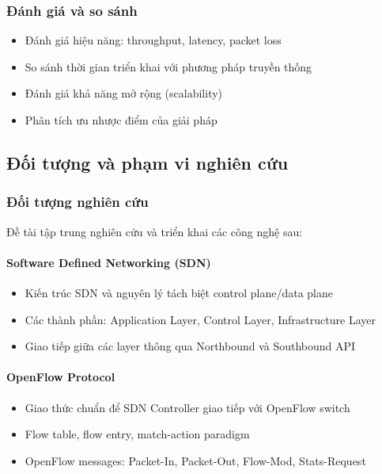 \subsubsection{Đánh giá và so sánh}
\begin{itemize}
    \item Đánh giá hiệu năng: throughput, latency, packet loss
    \item So sánh thời gian triển khai với phương pháp truyền thống
    \item Đánh giá khả năng mở rộng (scalability)
    \item Phân tích ưu nhược điểm của giải pháp
\end{itemize}

\subsection{Đối tượng và phạm vi nghiên cứu}

\subsubsection{Đối tượng nghiên cứu}

Đề tài tập trung nghiên cứu và triển khai các công nghệ sau:

\paragraph{Software Defined Networking (SDN)}
\begin{itemize}
    \item Kiến trúc SDN và nguyên lý tách biệt control plane/data plane
    \item Các thành phần: Application Layer, Control Layer, Infrastructure Layer
    \item Giao tiếp giữa các layer thông qua Northbound và Southbound API
\end{itemize}

\paragraph{OpenFlow Protocol}
\begin{itemize}
    \item Giao thức chuẩn để SDN Controller giao tiếp với OpenFlow switch
    \item Flow table, flow entry, match-action paradigm
    \item OpenFlow messages: Packet-In, Packet-Out, Flow-Mod, Stats-Request
\end{itemize}

